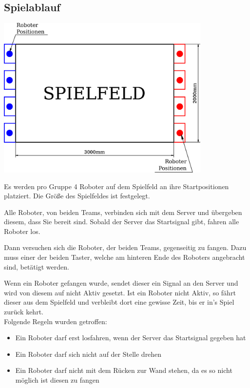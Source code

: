 \subsection{Spielablauf}
\begin{center}
	\includegraphics[width=0.8\textwidth]{Bilder/Spielfeld_2.pdf}
\end{center}
Es werden pro Gruppe 4 Roboter auf dem Spielfeld an ihre Startpositionen platziert.
Die Größe des Spielfeldes ist festgelegt.


Alle Roboter, von beiden Teams, verbinden sich mit dem Server und übergeben diesem, dass Sie bereit sind. Sobald der Server das Startsignal gibt, fahren alle Roboter los.

Dann versuchen sich die Roboter, der beiden Teams, gegenseitig zu fangen. Dazu muss einer der beiden Taster, welche am hinteren Ende des Roboters angebracht sind, betätigt werden.


Wenn ein Roboter gefangen wurde, sendet dieser ein Signal an den Server und wird von diesem auf nicht Aktiv gesetzt.
Ist ein Roboter nicht Aktiv, so fährt dieser aus dem Spielfeld und verbleibt dort eine gewisse Zeit, bis er in's Spiel zurück kehrt.\\
\newline
Folgende Regeln wurden getroffen:
\begin{itemize}
	\item Ein Roboter darf erst losfahren, wenn der Server das Startsignal gegeben hat
	\item Ein Roboter darf sich nicht auf der Stelle drehen
	\item Ein Roboter darf nicht mit dem Rücken zur Wand stehen, da es so nicht möglich ist diesen zu fangen 
\end{itemize}